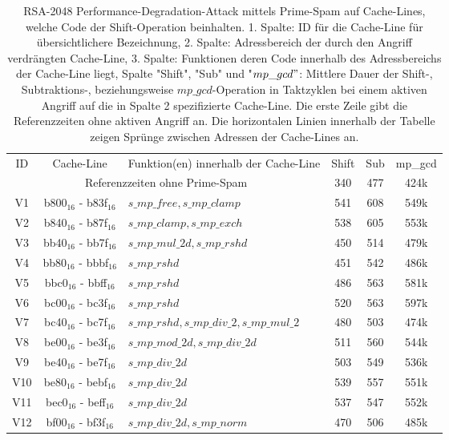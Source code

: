 \begin{table}[h]
\caption{RSA-2048 Performance-Degradation-Attack mittels Prime-Spam auf Cache-Lines, welche Code der Shift-Operation beinhalten. 1. Spalte: ID für die Cache-Line für übersichtlichere Bezeichnung, 2. Spalte: Adressbereich der durch den Angriff verdrängten Cache-Line, 3. Spalte: Funktionen deren Code innerhalb des Adressbereichs der Cache-Line liegt, Spalte "Shift", "Sub" und "$mp\_gcd"$: Mittlere Dauer der Shift-, Subtraktions-, beziehungsweise $mp\_gcd$-Operation in Taktzyklen bei einem aktiven Angriff auf die in Spalte 2 spezifizierte Cache-Line. Die erste Zeile gibt die Referenzzeiten ohne aktiven Angriff an. Die horizontalen Linien innerhalb der Tabelle zeigen Sprünge zwischen Adressen der Cache-Lines an.}
\label{tbl:PerformanceDegShift}
\begin{tabular}{cclccc}
ID & Cache-Line  & Funktion(en) innerhalb der Cache-Line                                  & Shift & Sub & mp\_gcd \\[10pt]
\multicolumn{3}{c}{Referenzzeiten ohne Prime-Spam}                      & 340   & 477         & 424k    \\
V1 & b800$_{16}$ - b83f$_{16}$ & $s\_mp\_free, s\_mp\_clamp$                 & 541   & 608         & 549k    \\
V2 & b840$_{16}$ - b87f$_{16}$ & $s\_mp\_clamp, s\_mp\_exch$                 & 538   & 605         & 553k    \\ \hline
V3 & bb40$_{16}$ - bb7f$_{16}$ & $s\_mp\_mul\_2d, s\_mp\_rshd$               & 450   & 514         & 479k    \\
V4 & bb80$_{16}$ - bbbf$_{16}$ & $s\_mp\_rshd$                               & 451   & 542         & 486k    \\
V5 & bbc0$_{16}$ - bbff$_{16}$ & $s\_mp\_rshd$                               & 486   & 563         & 581k    \\
V6 & bc00$_{16}$ - bc3f$_{16}$ & $s\_mp\_rshd$                               & 520   & 563         & 597k    \\
V7 & bc40$_{16}$ - bc7f$_{16}$ & $s\_mp\_rshd, s\_mp\_div\_2, s\_mp\_mul\_2$ & 480   & 503         & 474k    \\ \hline
V8 & be00$_{16}$ - be3f$_{16}$ & $s\_mp\_mod\_2d, s\_mp\_div\_2d$            & 511   & 560         & 544k    \\
V9 & be40$_{16}$ - be7f$_{16}$ & $s\_mp\_div\_2d$                            & 503   & 549         & 536k    \\
V10 & be80$_{16}$ - bebf$_{16}$ & $s\_mp\_div\_2d$                            & 539   & 557         & 551k    \\
V11 & bec0$_{16}$ - beff$_{16}$ & $s\_mp\_div\_2d$                            & 537   & 547         & 552k    \\
V12 & bf00$_{16}$ - bf3f$_{16}$ & $s\_mp\_div\_2d, s\_mp\_norm$               & 470   & 506         & 485k   
\end{tabular}
\end{table}

